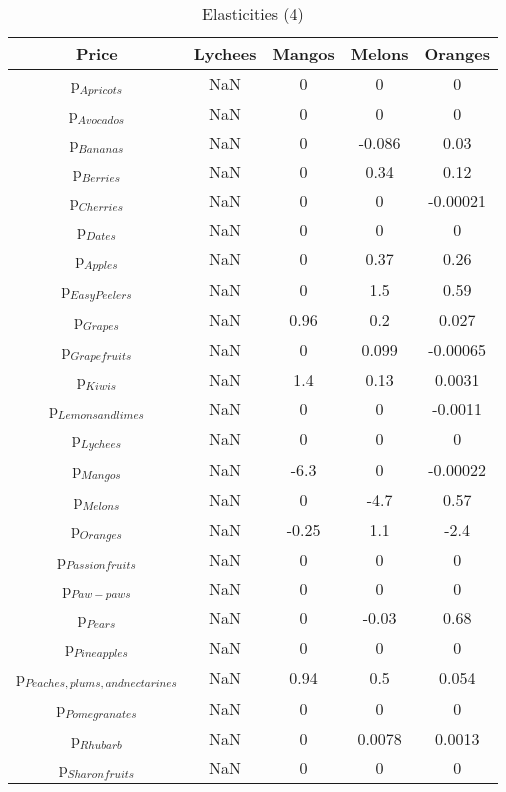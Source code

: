 \documentclass[11pt]{article}
\begin{document}
\begin{table}[h]
\caption{Elasticities (4)}
\label{Table: elasticities 4}
\begin{center}
\begin{tabular}{ccccc}
Price & Lychees & Mangos & Melons & Oranges \\ \hline
p$_{Apricots}$ & NaN & 0 & 0 & 0 \\ 
p$_{Avocados}$ & NaN & 0 & 0 & 0 \\ 
p$_{Bananas}$ & NaN & 0 & -0.086 & 0.03 \\ 
p$_{Berries}$ & NaN & 0 & 0.34 & 0.12 \\ 
p$_{Cherries}$ & NaN & 0 & 0 & -0.00021 \\ 
p$_{Dates}$ & NaN & 0 & 0 & 0 \\ 
p$_{Apples}$ & NaN & 0 & 0.37 & 0.26 \\ 
p$_{Easy Peelers}$ & NaN & 0 & 1.5 & 0.59 \\ 
p$_{Grapes}$ & NaN & 0.96 & 0.2 & 0.027 \\ 
p$_{Grapefruits}$ & NaN & 0 & 0.099 & -0.00065 \\ 
p$_{Kiwis}$ & NaN & 1.4 & 0.13 & 0.0031 \\ 
p$_{Lemons and limes}$ & NaN & 0 & 0 & -0.0011 \\ 
p$_{Lychees}$ & NaN & 0 & 0 & 0 \\ 
p$_{Mangos}$ & NaN & -6.3 & 0 & -0.00022 \\ 
p$_{Melons}$ & NaN & 0 & -4.7 & 0.57 \\ 
p$_{Oranges}$ & NaN & -0.25 & 1.1 & -2.4 \\ 
p$_{Passion fruits}$ & NaN & 0 & 0 & 0 \\ 
p$_{Paw-paws}$ & NaN & 0 & 0 & 0 \\ 
p$_{Pears}$ & NaN & 0 & -0.03 & 0.68 \\ 
p$_{Pineapples}$ & NaN & 0 & 0 & 0 \\ 
p$_{Peaches, plums, and nectarines}$ & NaN & 0.94 & 0.5 & 0.054 \\ 
p$_{Pomegranates}$ & NaN & 0 & 0 & 0 \\ 
p$_{Rhubarb}$ & NaN & 0 & 0.0078 & 0.0013 \\ 
p$_{Sharon fruits}$ & NaN & 0 & 0 & 0 \\ 
\end{tabular}
\end{center}
\end{table}
\end{document}
